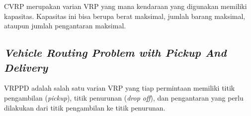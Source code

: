 CVRP merupakan varian VRP yang mana kendaraan yang digunakan memiliki kapasitas. Kapasitas ini bisa
berupa berat maksimal, jumlah barang maksimal, ataupun jumlah pengantaran maksimal.

\subsection{\textit{Vehicle Routing Problem with Pickup And Delivery}}

VRPPD adalah salah satu varian VRP yang tiap permintaan memiliki titik pengambilan
(\textit{pickup}), titik penurunan (\textit{drop off}), dan pengantaran yang perlu dilakukan dari
titik pengambilan ke titik penurunan.